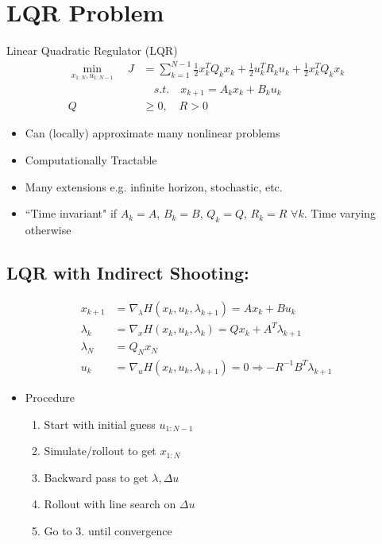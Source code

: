\documentclass[11pt]{article}
\begin{document}
\section{LQR Problem}
Linear Quadratic Regulator (LQR)
\begin{align*}
    \min_{x_{1:N},u_{1:N-1}} \quad J &= \sum_{k=1}^{N-1} \frac{1}{2}x_k^TQ_kx_k + \frac{1}{2} u_k^TR_ku_k + \frac{1}{2}x_k^TQ_kx_k
    \\
    &\quad s.t. \quad x_{k+1} = A_kx_k + B_ku_k
    \\
    Q&\geq 0, \quad R>0
\end{align*}
\begin{itemize}
    \item Can (locally) approximate many nonlinear problems
    \item Computationally Tractable
    \item Many extensions e.g. infinite horizon, stochastic, etc.
    \item ``Time invariant" if $A_k = A$, $B_k=B$, $Q_k=Q$, $R_k=R$ $\forall k$. Time varying otherwise
\end{itemize}

\subsection{LQR with Indirect Shooting:}
\begin{align*}
    x_{k+1} &= \nabla_\lambda H(x_k,u_k,\lambda_{k+1}) = Ax_k+Bu_k
    \\
    \lambda_k &= \nabla_x H(x_k,u_k,\lambda_k) = Qx_k + A^T\lambda_{k+1}
    \\
    \lambda_N &= Q_Nx_N
    \\
    u_k &= \nabla_u H(x_k,u_k,\lambda_{k+1}) = 0 \Rightarrow -R^{-1}B^T\lambda_{k+1}
\end{align*}
\begin{itemize}
    \item Procedure
    \begin{enumerate}
        \item Start with initial guess $u_{1:N-1}$
        \item Simulate/rollout to get $x_{1:N}$
        \item Backward pass to get $\lambda, \Delta u$
        \item Rollout with line search on $\Delta u$
        \item Go to 3. until convergence
    \end{enumerate}
\end{itemize}
\end{document}
